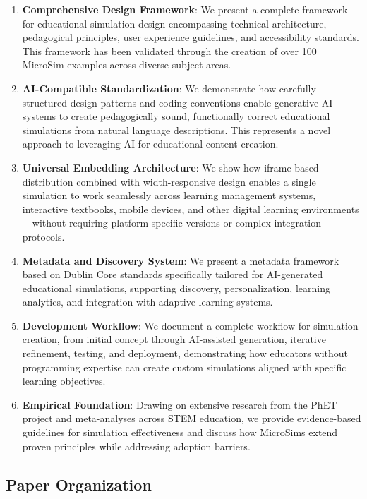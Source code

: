 \begin{enumerate}
\item \textbf{Comprehensive Design Framework}: We present a complete framework for educational simulation design encompassing technical architecture, pedagogical principles, user experience guidelines, and accessibility standards. This framework has been validated through the creation of over 100 MicroSim examples across diverse subject areas.

\item \textbf{AI-Compatible Standardization}: We demonstrate how carefully structured design patterns and coding conventions enable generative AI systems to create pedagogically sound, functionally correct educational simulations from natural language descriptions. This represents a novel approach to leveraging AI for educational content creation.

\item \textbf{Universal Embedding Architecture}: We show how iframe-based distribution combined with width-responsive design enables a single simulation to work seamlessly across learning management systems, interactive textbooks, mobile devices, and other digital learning environments—without requiring platform-specific versions or complex integration protocols.

\item \textbf{Metadata and Discovery System}: We present a metadata framework based on Dublin Core standards specifically tailored for AI-generated educational simulations, supporting discovery, personalization, learning analytics, and integration with adaptive learning systems.

\item \textbf{Development Workflow}: We document a complete workflow for simulation creation, from initial concept through AI-assisted generation, iterative refinement, testing, and deployment, demonstrating how educators without programming expertise can create custom simulations aligned with specific learning objectives.

\item \textbf{Empirical Foundation}: Drawing on extensive research from the PhET project and meta-analyses across STEM education, we provide evidence-based guidelines for simulation effectiveness and discuss how MicroSims extend proven principles while addressing adoption barriers.
\end{enumerate}

\subsection{Paper Organization}

